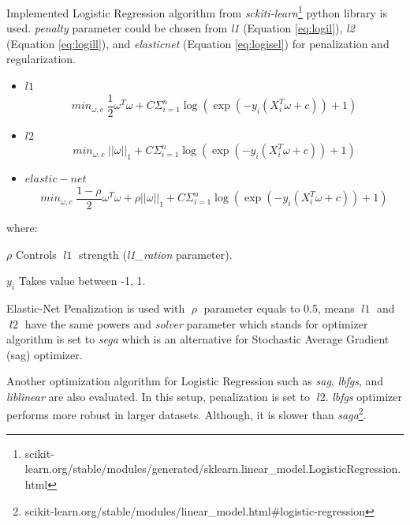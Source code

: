 Implemented Logistic Regression algorithm from \textit{sckiti-learn}\footnote{scikit-learn.org/stable/modules/generated/sklearn.linear\_model.LogisticRegression.html} python library is used. \textit{penalty} parameter could be chosen from \textit{l1} (Equation \ref{eq:logil}), \textit{l2} (Equation \ref{eq:logill}), and \textit{elasticnet} (Equation \ref{eq:logisel}) for penalization and regularization.
\begin{itemize}
	
	\item $l1$
		\begin{equation}
		\label{eq:logil}
		 min_{\omega,c} \; \frac{1}{2}\omega^{T}\omega + C \Sigma_{i=1}^{n} \log\left(\exp\left(-y_{i}\left(X^{T}_{i}\omega + c \right)\right) + 1 \right)
		\end{equation}
	\item $l2$
		\begin{equation}
		\label{eq:logill}
		 min_{\omega,c} \; \left|\left|\omega\right|\right|_{1} + C \Sigma_{i=1}^{n} \log\left(\exp\left(-y_{i}\left(X^{T}_{i}\omega + c \right)\right) + 1 \right) 
		\end{equation}
		
	\item $elastic-net$
		\begin{equation}
		\label{eq:logisel}
		min_{\omega,c} \; \frac{1-\rho}{2}\omega^{T}\omega +\rho\left|\left|\omega\right|\right|_{1} + C \Sigma_{i=1}^{n} \log\left(\exp\left(-y_{i}\left(X^{T}_{i}\omega + c \right)\right) + 1 \right) 
		\end{equation}
	
\end{itemize}
where:
\begin{eqexpl}[25mm]
	\item{$\rho$} Controls $\; l1 \;$ strength (\textit{l1\_ration} parameter).
	\item{$y_{i}$} Takes value between -1, 1.
\end{eqexpl}
\bigbreak
Elastic-Net Penalization is used with $\; \rho \;$ parameter equals to 0.5, means $\;l1\;$ and $\;l2\;$ have the same powers and \textit{solver} parameter which stands for optimizer algorithm is set to \textit{sega} which is an alternative for Stochastic Average Gradient (sag) optimizer. 

Another optimization algorithm for Logistic Regression such as \textit{sag}, \textit{lbfgs}, and \textit{liblinear} are also evaluated. In this setup, penalization is set to $\; l2$. \textit{lbfgs} optimizer performs more robust in larger datasets. Although, it is slower than \textit{saga}\footnote{scikit-learn.org/stable/modules/linear\_model.html\#logistic-regression}. 

